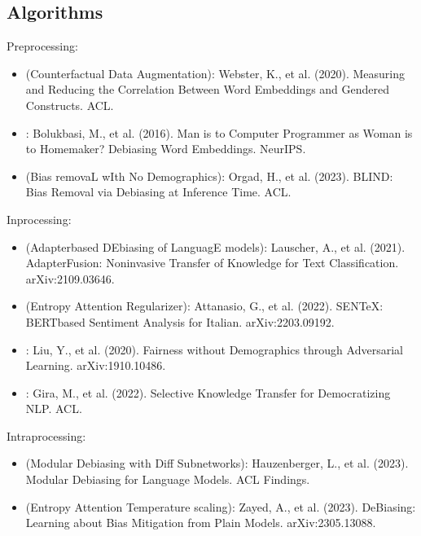 \documentclass[letterpaper,10pt,english]{sphinxmanual}
\begin{document}
\subsection{Algorithms}
\label{\detokenize{citation:algorithms}}
\sphinxAtStartPar
Pre\sphinxhyphen{}processing:
\begin{itemize}
\item {} 
\sphinxAtStartPar
{} (Counterfactual Data Augmentation): Webster, K., et al. (2020). Measuring and Reducing the Correlation Between Word Embeddings and Gendered Constructs. ACL.

\item {} 
\sphinxAtStartPar
{}: Bolukbasi, M., et al. (2016). Man is to Computer Programmer as Woman is to Homemaker? Debiasing Word Embeddings. NeurIPS.

\item {} 
\sphinxAtStartPar
{} (Bias removaL wIth No Demographics): Orgad, H., et al. (2023). BLIND: Bias Removal via Debiasing at Inference Time. ACL.

\end{itemize}

\sphinxAtStartPar
In\sphinxhyphen{}processing:
\begin{itemize}
\item {} 
\sphinxAtStartPar
{} (Adapter\sphinxhyphen{}based DEbiasing of LanguagE models): Lauscher, A., et al. (2021). AdapterFusion: Non\sphinxhyphen{}invasive Transfer of Knowledge for Text Classification. arXiv:2109.03646.

\item {} 
\sphinxAtStartPar
{} (Entropy Attention Regularizer): Attanasio, G., et al. (2022). SENTeX: BERT\sphinxhyphen{}based Sentiment Analysis for Italian. arXiv:2203.09192.

\item {} 
\sphinxAtStartPar
{}: Liu, Y., et al. (2020). Fairness without Demographics through Adversarial Learning. arXiv:1910.10486.

\item {} 
\sphinxAtStartPar
{}: Gira, M., et al. (2022). Selective Knowledge Transfer for Democratizing NLP. ACL.

\end{itemize}

\sphinxAtStartPar
Intra\sphinxhyphen{}processing:
\begin{itemize}
\item {} 
\sphinxAtStartPar
{} (Modular Debiasing with Diff Subnetworks): Hauzenberger, L., et al. (2023). Modular Debiasing for Language Models. ACL Findings.

\item {} 
\sphinxAtStartPar
{} (Entropy Attention Temperature scaling): Zayed, A., et al. (2023). DeBiasing: Learning about Bias Mitigation from Plain Models. arXiv:2305.13088.

\end{itemize}



\renewcommand{\indexname}{Index}
\printindex
\end{document}
